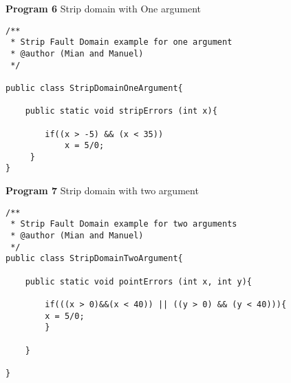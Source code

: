 \textbf{Program 6} Strip domain with One argument
\begin{lstlisting}
/**
 * Strip Fault Domain example for one argument
 * @author (Mian and Manuel)
 */

public class StripDomainOneArgument{

	public static void stripErrors (int x){
	
		if((x > -5) && (x < 35))
			x = 5/0;
  	 }
}
\end{lstlisting}
\textbf{Program 7} Strip domain with two argument
\begin{lstlisting}
/**
 * Strip Fault Domain example for two arguments
 * @author (Mian and Manuel)
 */
public class StripDomainTwoArgument{

	public static void pointErrors (int x, int y){

		if(((x > 0)&&(x < 40)) || ((y > 0) && (y < 40))){
		x = 5/0;
		}
  	
	}

}

\end{lstlisting}
